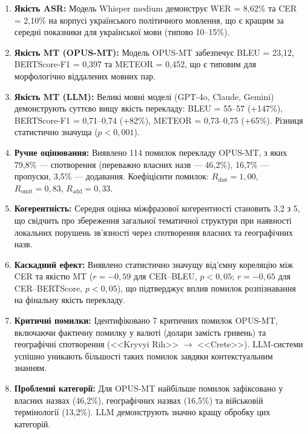 \begin{enumerate}
    \item \textbf{Якість ASR:} Модель Whisper medium демонструє WER = 8,62\%
    та CER = 2,10\% на корпусі українського політичного мовлення, що є
    кращим за середні показники для української мови (типово 10--15\%).

    \item \textbf{Якість MT (OPUS-MT):} Модель OPUS-MT забезпечує BLEU = 23,12,
    BERTScore-F1 = 0,397 та METEOR = 0,452, що є типовим для
    морфологічно віддалених мовних пар.

    \item \textbf{Якість MT (LLM):} Великі мовні моделі (GPT-4o, Claude, Gemini)
    демонструють суттєво вищу якість перекладу: BLEU = 55--57 (+147\%),
    BERTScore-F1 = 0,71--0,74 (+82\%), METEOR = 0,73--0,75 (+65\%).
    Різниця статистично значуща ($p < 0,001$).

    \item \textbf{Ручне оцінювання:} Виявлено 114 помилок перекладу OPUS-MT, з яких
    79,8\% --- спотворення (переважно власних назв --- 46,2\%), 16,7\% ---
    пропуски, 3,5\% --- додавання. Коефіцієнти помилок: $R_{\text{dist}} = 1,00$,
    $R_{\text{omit}} = 0,83$, $R_{\text{add}} = 0,33$.

    \item \textbf{Когерентність:} Середня оцінка міжфразової когерентності
    становить 3,2 з 5, що свідчить про збереження загальної тематичної
    структури при наявності локальних порушень зв'язності через спотворення
    власних та географічних назв.

    \item \textbf{Каскадний ефект:} Виявлено статистично значущу від'ємну
    кореляцію між CER та якістю MT ($r = -0,59$ для CER--BLEU, $p < 0,05$;
    $r = -0,65$ для CER--BERTScore, $p < 0,05$), що підтверджує вплив
    помилок розпізнавання на фінальну якість перекладу.

    \item \textbf{Критичні помилки:} Ідентифіковано 7 критичних помилок OPUS-MT,
    включаючи фактичну помилку у валюті (долари замість гривень) та
    географічні спотворення (<<Kryvyi Rih>> $\rightarrow$ <<Crete>>).
    LLM-системи успішно уникають більшості таких помилок завдяки
    контекстуальним знанням.

    \item \textbf{Проблемні категорії:} Для OPUS-MT найбільше помилок зафіксовано у
    власних назвах (46,2\%), географічних назвах (16,5\%) та військовій
    термінології (13,2\%). LLM демонструють значно кращу обробку цих категорій.
\end{enumerate}

\clearpage

